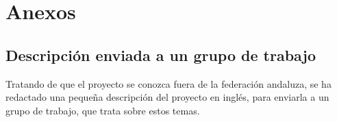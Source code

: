 



\tableofcontents












\chapter{Anexos}
    \section{Descripción enviada a un grupo de trabajo}

    Tratando de que el proyecto se conozca fuera de la federación andaluza,
    se ha redactado una pequeña descripción del proyecto en inglés, para
    enviarla a un grupo de trabajo, que trata sobre estos temas.

